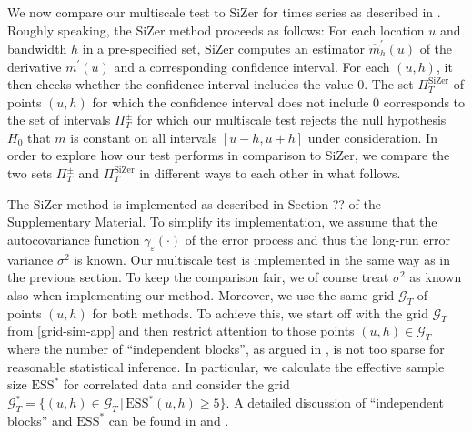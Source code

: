 

We now compare our multiscale test to SiZer for times series as described in \cite{Rondonotti2007}. Roughly speaking, the SiZer method proceeds as follows: For each location $u$ and bandwidth $h$ in a pre-specified set, SiZer computes an estimator $\widehat{m}_h^\prime(u)$ of the derivative $m^\prime(u)$ and a corresponding confidence interval. For each $(u,h)$, it then checks whether the confidence interval includes the value $0$. The set $\Pi_T^{\text{SiZer}}$ of points $(u,h)$ for which the confidence interval does not include $0$ corresponds to the set of intervals $\Pi_T^\pm$ for which our multiscale test rejects the null hypothesis $H_0$ that $m$ is constant on all intervals $[u-h,u+h]$ under consideration. %
In order to explore how our test performs in comparison to SiZer, we compare the two sets $\Pi_T^\pm$ and $\Pi_T^{\text{SiZer}}$ in different ways to each other in what follows. 


The SiZer method is implemented as described in Section ?? of the Supplementary Material. To simplify its implementation, we assume that the autocovariance function $\gamma_\varepsilon(\cdot)$ of the error process and thus the long-run error variance $\sigma^2$ is known. Our multiscale test is implemented in the same way as in the previous section. To keep the comparison fair, we of course treat $\sigma^2$ as known also when implementing our method. Moreover, we use the same grid $\mathcal{G}_T$ of points $(u,h)$ for both methods. To achieve this, we start off with the grid $\mathcal{G}_T$ from \eqref{grid-sim-app} and then restrict attention to those points $(u,h) \in \mathcal{G}_T$ where the number of ``independent blocks'', as argued in \cite{Rondonotti2007}, is not too sparse for reasonable statistical inference. In particular, we calculate the effective sample size $\text{ESS}^*$ for correlated data and consider the grid $\mathcal{G}_T^* = \{ (u, h) \in \mathcal{G}_T \, | \, \text{ESS}^*(u, h) \geq 5 \}$. A detailed discussion of ``independent blocks'' and $\text{ESS}^*$ can be found in \cite{ChaudhuriMarron1999} and \cite{Rondonotti2007}. 


